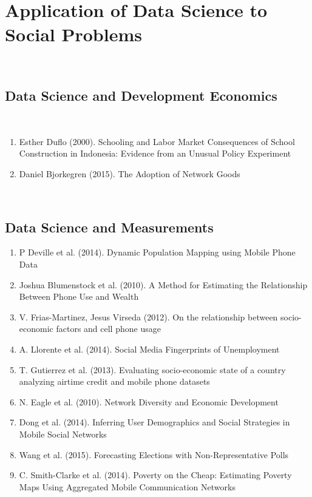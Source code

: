 \\
\\
\section{Application of Data Science to Social Problems}
\\

\subsection{Data Science and Development Economics}
\\
\begin{enumerate}
\item Esther Duflo (2000). Schooling and Labor Market Consequences of School Construction in Indonesia: Evidence from an Unusual Policy Experiment  \cite{Duflo_2000}
\item Daniel Bjorkegren (2015). The Adoption of Network Goods  \cite{Bjorkegren}
\end{enumerate}
\\
\subsection{Data Science and Measurements}
\begin{enumerate}
\item P Deville et al. (2014). Dynamic Population Mapping using Mobile Phone Data\cite{Deville_2014}
\item Joshua Blumenstock et al. (2010). A Method for Estimating the Relationship Between Phone Use and Wealth \cite{blumenstock2010method}
\item V. Frias-Martinez, Jesus Virseda (2012). On the relationship between socio-economic factors and cell phone usage \cite{Frias_Martinez_2012}
\item A. Llorente et al. (2014). Social Media Fingerprints of Unemployment \cite{Llorente_2015}
\item T. Gutierrez et al. (2013). Evaluating socio-economic state of a country analyzing airtime credit and mobile phone datasets \cite{gutierrez2013evaluating} 
\item N. Eagle et al. (2010). Network Diversity and Economic Development\cite{eagle2010network}
\item Dong et al. (2014). Inferring User Demographics and Social Strategies in Mobile Social Networks \cite{Dong:2014:IUD:2623330.2623703}
\item Wang et al. (2015). Forecasting Elections with Non-Representative Polls\cite{Wang2015980}
\item C. Smith-Clarke et al. (2014). Poverty on the Cheap: Estimating Poverty Maps Using Aggregated Mobile Communication Networks\cite{Smith-Clarke:2014:PCE:2556288.2557358}
\end{enumerate}
\\
